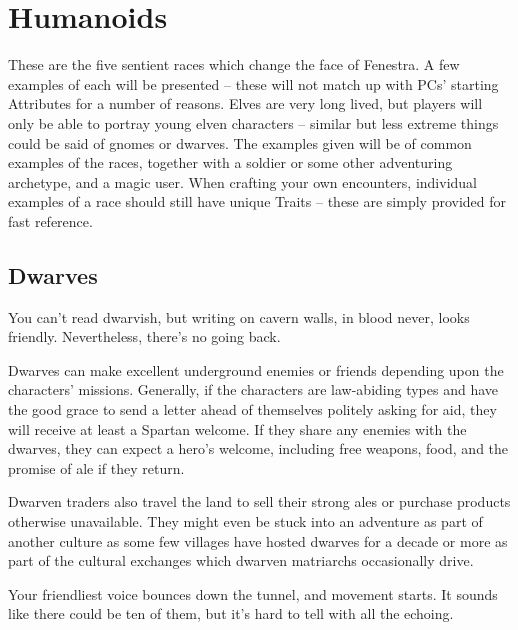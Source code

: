 \section{Humanoids}

\begin{multicols}{2}

\noindent
These are the five sentient races which change the face of Fenestra.
A few examples of each will be presented -- these will not match up with PCs' starting Attributes for a number of reasons.
Elves are very long lived, but players will only be able to portray young elven characters -- similar but less extreme things could be said of gnomes or dwarves.
The examples given will be of common examples of the races, together with a soldier or some other adventuring archetype, and a magic user.
When crafting your own encounters, individual examples of a race should still have unique Traits -- these are simply provided for fast reference.

\subsection{Dwarves}

\begin{boxtext}

  You can't read dwarvish, but writing on cavern walls, in blood never, looks friendly.
  Nevertheless, there's no going back.

\end{boxtext}

Dwarves can make excellent underground enemies or friends depending upon the characters' missions.
Generally, if the characters are law-abiding types and have the good grace to send a letter ahead of themselves politely asking for aid, they will receive at least a Spartan welcome.
If they share any enemies with the dwarves, they can expect a hero's welcome, including free weapons, food, and the promise of ale if they return.

Dwarven traders also travel the land to sell their strong ales or purchase products otherwise unavailable.
They might even be stuck into an adventure as part of another culture as some few villages have hosted dwarves for a decade or more as part of the cultural exchanges which dwarven matriarchs occasionally drive.

\begin{boxtext}

  Your friendliest voice bounces down the tunnel, and movement starts.
  It sounds like there could be ten of them, but it's hard to tell with all the echoing.


\end{boxtext}
\end{multicols}
